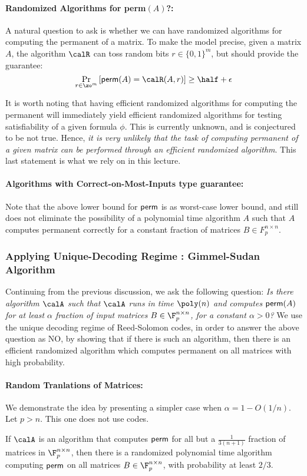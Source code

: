 \paragraph{Randomized Algorithms for {\sf perm$(A)$}?:}
A natural question to ask is whether we can have randomized algorithms for computing the permanent of a matrix. To make the model precise, given a matrix $A$, the algorithm $\calR$ can toss random bits $r \in \{0,1\}^m$, but should provide the guarantee:
$$\Pr_{r \in \zo^m} \left[ {\sf perm}(A) = \calR(A,r) \right] \ge \half+\epsilon$$

It is worth noting that having efficient randomized algorithms for computing the permanent will immediately yield efficient randomized algorithms for testing satisfiability of a given formula $\phi$. This is currently unknown, and is conjectured to be not true. Hence, \textit{it is very unlikely that the task of computing permanent of a given matrix can be performed through an efficient randomized algorithm}. This last statement is what we rely on in this lecture.\\[-8mm]

\paragraph{Algorithms with Correct-on-Most-Inputs type guarantee:}
Note that the above lower bound  for ${\sf perm}$  is as worst-case lower bound, and still does not eliminate the possibility of a polynomial time algorithm $A$ such that $A$ computes permanent correctly for a constant fraction of matrices $B \in F_p^{n \times n}$. 

\subsubsection{Applying Unique-Decoding Regime : Gimmel-Sudan Algorithm}

Continuing from the previous discussion, we ask the following question: \textit{Is there  algorithm $\calA$ such that $\calA$ runs in time $\poly(n)$ and computes ${\sf perm}(A)$ for at least $\alpha$ fraction of input matrices $B \in \F_p^{n \times n}$, for a constant $\alpha>0$?}
We use the unique decoding regime of Reed-Solomon codes, in order to answer the above question as NO, by showing that if there is such an algorithm, then there is an efficient randomized algorithm which computes permanent on all matrices with high probability.

\paragraph{Random Tranlations of Matrices:} We demonstrate the idea by presenting a simpler case when $\alpha = 1-O(1/n)$. Let $p > n$. This one does not use codes. 
\begin{theorem}
If $\calA$ is an algorithm that computes ${\sf perm}$ for all but a $\frac{1}{3(n+1)}$ fraction of matrices in $\F_p^{n \times n}$, 
then there is a randomized polynomial time algorithm computing ${\sf perm}$ on all matrices $B \in \F_p^{n \times n}$, with probability at least $2/3$.
\end{theorem}


